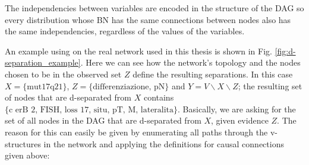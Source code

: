 The independencies between variables are encoded in the structure of the DAG so every distribution whose BN has the same connections between nodes also has the same independencies, regardless of the values of the variables.

An example using on the real network used in this thesis is shown in Fig. \ref{fig:d-separation_example}.
Here we can see how the network's topology and the nodes chosen to be in the observed set $Z$ define the resulting separations.
In this case $X= \{ \text{mut17q21} \}$, $Z= \{ \text{differenziazione, pN} \}$ and $Y=V \smallsetminus X \smallsetminus Z$; the resulting set of nodes that are d-separated from $X$ contains $\{ \text{c erB 2, FISH, loss 17, situ, pT, M, lateralita} \}$.
Basically, we are asking for the set of all nodes in the DAG that are d-separated from $X$, given evidence $Z$.
The reason for this can easily be given by enumerating all paths through the v-structures in the network and applying the definitions for causal connections given above:
